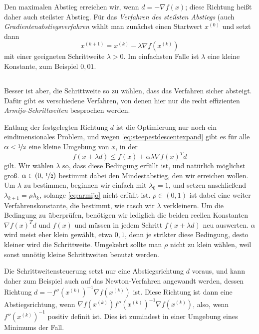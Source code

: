 Den maximalen Abstieg erreichen wir, wenn $d = -\nabla f(x)$; diese
Richtung heißt daher auch steilster Abstieg. Für das \emph{Verfahren
  des steilsten Abstiegs} (auch \emph{Gradientenabstiegsverfahren}
wählt man zunächst einen Startwert $x^{(0)}$ und setzt dann
\begin{equation}
  \label{eq:steepestdescent}
  x^{(k+1)} = x^{(k)} - \lambda \nabla f\left(x^{(k)}\right)
\end{equation}
mit einer geeigneten Schrittweite $\lambda>0$. Im einfachsten Falle
ist $\lambda$ eine kleine Konstante, zum Beispiel $0,01$.

\subsection{}

Besser ist aber, die Schrittweite so zu wählen, dass das Verfahren
sicher absteigt. Dafür gibt es verschiedene Verfahren, von denen hier
nur die recht effizienten \emph{Armijo-Schrittweiten} besprochen
werden.

Entlang der festgelegten Richtung $d$ ist die Optimierung nur noch ein
eindimensionales Problem, und wegen \eqref{eq:steepestdescentexpand}
gibt es für alle $\alpha<\nicefrac{1}{2}$ eine kleine Umgebung von
$x$, in der
\begin{equation}
  \label{eq:armijo}
  f(x + \lambda d) \le f(x) + \alpha\lambda \nabla f(x)^Td
\end{equation}
gilt. Wir wählen $\lambda$ so, dass diese Bedingung erfüllt ist, und
natürlich möglichst groß. $\alpha\in(0,\,\nicefrac{1}{2})$ bestimmt
dabei den Mindestabstieg, den wir erreichen wollen. Um $\lambda$ zu
bestimmen, beginnen wir einfach mit $\lambda_0=1$, und setzen
anschließend $\lambda_{k+1} = \rho\lambda_{k}$, solange
\eqref{eq:armijo} nicht erfüllt ist. $\rho\in (0,1)$ ist dabei eine
weiter Verfahrenskonstante, die bestimmt, wie rasch wir $\lambda$
verkleinern. Um die Bedingung zu überprüfen, benötigen wir lediglich
die beiden reellen Konstanten $\nabla f(x)^Td$ und $f(x)$ und müssen
in jedem Schritt $f(x + \lambda d)$ neu auswerten.  $\alpha$ wird
meist eher klein gewählt, etwa $0,1$, denn je strikter diese
Bedingung, desto kleiner wird die Schrittweite. Umgekehrt sollte man
$\rho$ nicht zu klein wählen, weil sonst unnötig kleine
Schrittweiten benutzt werden.

Die Schrittweitensteuerung setzt nur eine Abstiegsrichtung $d$ voraus,
und kann daher zum Beispiel auch auf das Newton-Verfahren angewandt
werden, dessen Richtung $d=-f''\left(x^{(k)}\right)^{-1}\nabla
f\left(x^{(k)}\right)$ ist. Diese Richtung ist dann eine
Abstiegsrichtung, wenn $\nabla f\left(x^{(k)}\right)
f''\left(x^{(k)}\right)^{-1} \nabla f\left(x^{(k)}\right)$, also, wenn
$f''\left(x^{(k)}\right)^{-1}$ positiv definit ist. Dies ist zumindest
in einer Umgebung eines Minimums der Fall.

